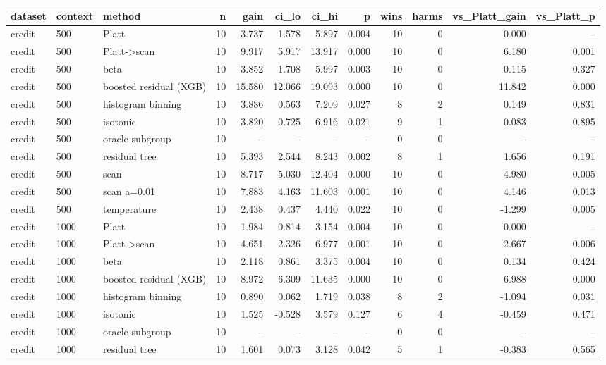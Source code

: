 \begin{tabular}{lllrrrrrrrrr}
\toprule
dataset & context & method & n & gain & ci_lo & ci_hi & p & wins & harms & vs_Platt_gain & vs_Platt_p \\
\midrule
credit & 500 & Platt & 10 & 3.737 & 1.578 & 5.897 & 0.004 & 10 & 0 & 0.000 & -- \\
credit & 500 & Platt->scan & 10 & 9.917 & 5.917 & 13.917 & 0.000 & 10 & 0 & 6.180 & 0.001 \\
credit & 500 & beta & 10 & 3.852 & 1.708 & 5.997 & 0.003 & 10 & 0 & 0.115 & 0.327 \\
credit & 500 & boosted residual (XGB) & 10 & 15.580 & 12.066 & 19.093 & 0.000 & 10 & 0 & 11.842 & 0.000 \\
credit & 500 & histogram binning & 10 & 3.886 & 0.563 & 7.209 & 0.027 & 8 & 2 & 0.149 & 0.831 \\
credit & 500 & isotonic & 10 & 3.820 & 0.725 & 6.916 & 0.021 & 9 & 1 & 0.083 & 0.895 \\
credit & 500 & oracle subgroup & 10 & -- & -- & -- & -- & 0 & 0 & -- & -- \\
credit & 500 & residual tree & 10 & 5.393 & 2.544 & 8.243 & 0.002 & 8 & 1 & 1.656 & 0.191 \\
credit & 500 & scan & 10 & 8.717 & 5.030 & 12.404 & 0.000 & 10 & 0 & 4.980 & 0.005 \\
credit & 500 & scan a=0.01 & 10 & 7.883 & 4.163 & 11.603 & 0.001 & 10 & 0 & 4.146 & 0.013 \\
credit & 500 & temperature & 10 & 2.438 & 0.437 & 4.440 & 0.022 & 10 & 0 & -1.299 & 0.005 \\
credit & 1000 & Platt & 10 & 1.984 & 0.814 & 3.154 & 0.004 & 10 & 0 & 0.000 & -- \\
credit & 1000 & Platt->scan & 10 & 4.651 & 2.326 & 6.977 & 0.001 & 10 & 0 & 2.667 & 0.006 \\
credit & 1000 & beta & 10 & 2.118 & 0.861 & 3.375 & 0.004 & 10 & 0 & 0.134 & 0.424 \\
credit & 1000 & boosted residual (XGB) & 10 & 8.972 & 6.309 & 11.635 & 0.000 & 10 & 0 & 6.988 & 0.000 \\
credit & 1000 & histogram binning & 10 & 0.890 & 0.062 & 1.719 & 0.038 & 8 & 2 & -1.094 & 0.031 \\
credit & 1000 & isotonic & 10 & 1.525 & -0.528 & 3.579 & 0.127 & 6 & 4 & -0.459 & 0.471 \\
credit & 1000 & oracle subgroup & 10 & -- & -- & -- & -- & 0 & 0 & -- & -- \\
credit & 1000 & residual tree & 10 & 1.601 & 0.073 & 3.128 & 0.042 & 5 & 1 & -0.383 & 0.565 \\

\end{tabular}
